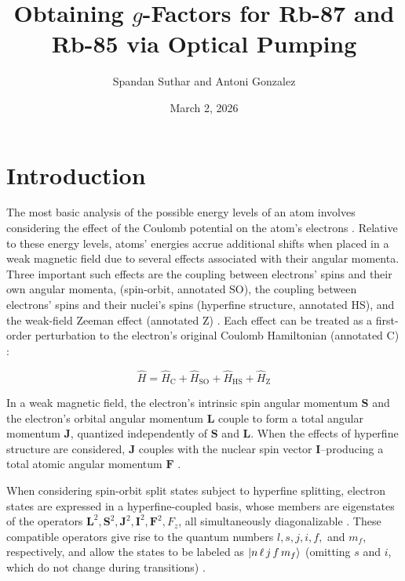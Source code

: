 \documentclass[11pt]{article}
\title{Obtaining $g$-Factors for Rb-87 and Rb-85 via Optical Pumping}
\author{Spandan Suthar and Antoni Gonzalez}
\date{March 2, 2026}
\begin{document}
\maketitle

\section{Introduction}

The most basic analysis of the possible energy levels of an atom involves
considering the effect of the Coulomb potential on the atom's
electrons \cite{harris, qmech, griffiths_qm}. Relative to these energy levels,
atoms' energies accrue additional shifts when placed in a weak
magnetic field due to several effects associated with their angular
momenta. Three
important such effects are the coupling between electrons' spins and
their own angular momenta, (spin-orbit, annotated SO), the coupling
between electrons' spins and their nuclei's spins
(hyperfine structure, annotated HS), and the weak-field
Zeeman effect (annotated Z) \cite{harris}. Each
effect can be treated as a
first-order perturbation to the electron's original Coulomb
Hamiltonian (annotated C) \cite{harris, qmech, griffiths_qm}:

\begin{equation}
  \hat H = \hat H_\text{C} + \hat
  H_\text{SO} + \hat H_\text{HS} +   \hat H_\text{Z}
  \label{eq:hamiltonian}
\end{equation}

In a weak magnetic field, the electron's intrinsic spin angular momentum
$\mathbf{S}$ and the electron's
orbital angular momentum $\mathbf{L}$ couple to form a total angular
momentum $\mathbf{J}$,
quantized independently of $\mathbf{S}$ and $\mathbf{L}$. When the
effects of hyperfine structure are considered, $\mathbf{J}$ couples with
the nuclear spin vector $\mathbf{I}$--producing a total atomic angular
momentum $\mathbf{F}$ \cite{harris}.

When considering spin-orbit
split states subject to hyperfine splitting, electron
states are expressed in a hyperfine-coupled basis, whose members
are eigenstates of the operators $\mathbf{L}^2, \mathbf{S}^2,
\mathbf{J}^2, \mathbf{I}^2, \mathbf{F}^2, F_z$, all simultaneously
diagonalizable \cite{qmech, harris}. These compatible operators give rise
to the quantum numbers $l, s, j, i, f,$ and $m_f$, respectively, and allow the
states to be labeled as $\ket{n\,\ell\,j\,f\,m_f}$ (omitting $s$ and
$i$, which do not change during transitions) \cite{qmech, harris}.
\end{document}

